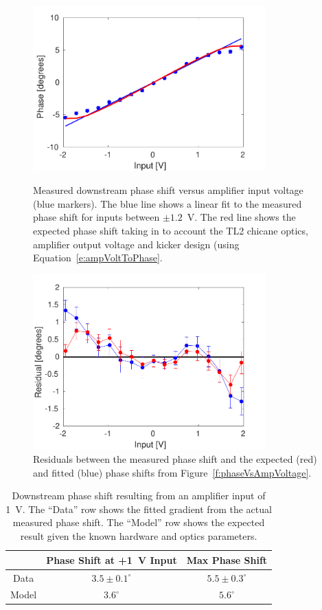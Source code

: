 \begin{figure}
  \centering
  \includegraphics[width=0.8\textwidth]{Figures/commissioning/phaseVsAmpVoltage}
  \caption{Measured downstream phase shift versus amplifier input voltage (blue markers). The blue line shows a linear fit to the measured phase shift for inputs between \(\pm1.2\)~V. The red line shows the expected phase shift taking in to account the TL2 chicane optics, amplifier output voltage and kicker design (using Equation~\ref{e:ampVoltToPhase}.}
  \label{f:phaseVsAmpVoltage}
  \includegraphics[width=0.8\textwidth]{Figures/commissioning/phaseVsAmpVoltage_residuals}
  \caption{Residuals between the measured phase shift and the expected (red) and fitted (blue) phase shifts from Figure~\ref{f:phaseVsAmpVoltage}.}
  \label{f:phaseVsAmp_resid}
\end{figure}

\begin{table}
  \begin{center}
    \begin{tabular}{| c | c | c |}
	   \hline
        & Phase Shift at +1~V Input & Max Phase Shift \\ \hline
       Data & \(3.5\pm0.1^\circ\) & \(5.5\pm0.3^\circ\) \\
	   Model & \(3.6^\circ\) & \(5.6^\circ\) \\
 	   \hline
    \end{tabular}
    \caption{Downstream phase shift resulting from an amplifier input of 1~V. The ``Data'' row shows the fitted gradient from the actual measured phase shift. The ``Model'' row shows the expected result given the known hardware and optics parameters.}
  	\label{t:PhaseVsDAC}
  \end{center}
\end{table}

